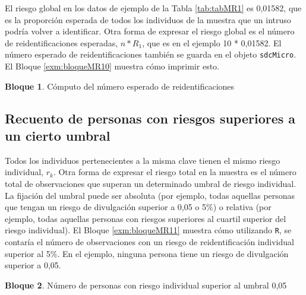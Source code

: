 \documentclass[]{book}
\newenvironment{Shaded}{\begin{snugshade}}{\end{snugshade}}
\newcommand{\CommentTok}[1]{\textcolor[rgb]{0.56,0.35,0.01}{\textit{#1}}}
\newcommand{\NormalTok}[1]{#1}
\newcommand{\OperatorTok}[1]{\textcolor[rgb]{0.81,0.36,0.00}{\textbf{#1}}}
\theoremstyle{definition}
\theoremstyle{definition}
\newtheorem{example}{Bloque}[chapter]
\theoremstyle{definition}
\theoremstyle{definition}
\theoremstyle{remark}
\begin{document}
El riesgo global en los datos de ejemplo de la Tabla \ref{tab:tabMR1} es 0,01582, que es la proporción esperada de todos los individuos de la muestra que un intruso podría volver a identificar. Otra forma de expresar el riesgo global es el número de reidentificaciones esperadas, \(n*R_{1}\), que es en el ejemplo 10 * 0,01582. El número esperado de reidentificaciones también se guarda en el objeto \texttt{sdcMicro}. El Bloque \ref{exm:bloqueMR10} muestra cómo imprimir esto.

\begin{example}
\protect\hypertarget{exm:bloqueMR10}{}{\label{exm:bloqueMR10} }Cómputo del número esperado de reidentificaciones
\end{example}

\begin{Shaded}
\end{Shaded}

\hypertarget{recuento-de-personas-con-riesgos-superiores-a-un-cierto-umbral}{%
\subsection{Recuento de personas con riesgos superiores a un cierto umbral}\label{recuento-de-personas-con-riesgos-superiores-a-un-cierto-umbral}}

Todos los individuos pertenecientes a la misma clave tienen el mismo riesgo individual, \(r_{k}\). Otra forma de expresar el riesgo total en la muestra es el número total de observaciones que superan un determinado umbral de riesgo individual. La fijación del umbral puede ser absoluta (por ejemplo, todas aquellas personas que tengan un riesgo de divulgación superior a 0,05 o 5\%) o relativa (por ejemplo, todas aquellas personas con riesgos superiores al cuartil superior del riesgo individual). El Bloque \ref{exm:bloqueMR11} muestra cómo utilizando \texttt{R}, se contaría el número de observaciones con un riesgo de reidentificación individual superior al 5\%. En el ejemplo, ninguna persona tiene un riesgo de divulgación superior a 0,05.

\begin{example}
\protect\hypertarget{exm:bloqueMR11}{}{\label{exm:bloqueMR11} }Número de personas con riesgo individual superior al umbral 0,05
\end{example}
\end{document}
